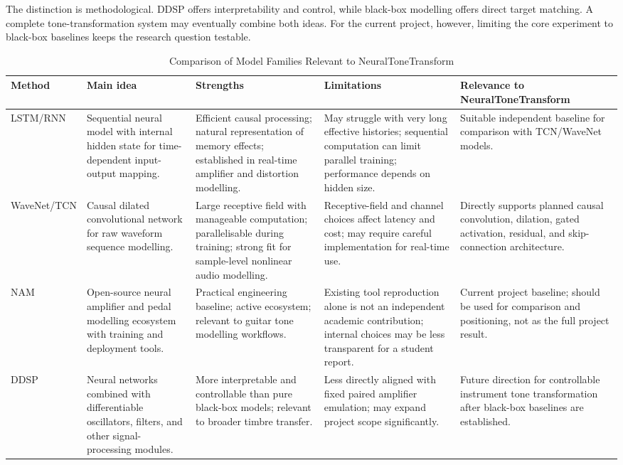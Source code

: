 \documentclass[conference]{IEEEtran}
\begin{document}
The distinction is methodological. DDSP offers interpretability and control, while black-box modelling offers direct target matching. A complete tone-transformation system may eventually combine both ideas. For the current project, however, limiting the core experiment to black-box baselines keeps the research question testable.

\begin{table}[t]
\caption{Comparison of Model Families Relevant to NeuralToneTransform}
\label{tab:model_comparison}
\centering
\footnotesize
\setlength{\tabcolsep}{3pt}
\begin{tabular}{@{}L{0.12\textwidth} L{0.19\textwidth} L{0.19\textwidth} L{0.19\textwidth} L{0.22\textwidth}@{}}
\toprule
\textbf{Method} & \textbf{Main idea} & \textbf{Strengths} & \textbf{Limitations} & \textbf{Relevance to NeuralToneTransform} \\
\midrule
LSTM/RNN & Sequential neural model with internal hidden state for time-dependent input-output mapping. & Efficient causal processing; natural representation of memory effects; established in real-time amplifier and distortion modelling. & May struggle with very long effective histories; sequential computation can limit parallel training; performance depends on hidden size. & Suitable independent baseline for comparison with TCN/WaveNet models. \\
\addlinespace
WaveNet/TCN & Causal dilated convolutional network for raw waveform sequence modelling. & Large receptive field with manageable computation; parallelisable during training; strong fit for sample-level nonlinear audio modelling. & Receptive-field and channel choices affect latency and cost; may require careful implementation for real-time use. & Directly supports planned causal convolution, dilation, gated activation, residual, and skip-connection architecture. \\
\addlinespace
NAM & Open-source neural amplifier and pedal modelling ecosystem with training and deployment tools. & Practical engineering baseline; active ecosystem; relevant to guitar tone modelling workflows. & Existing tool reproduction alone is not an independent academic contribution; internal choices may be less transparent for a student report. & Current project baseline; should be used for comparison and positioning, not as the full project result. \\
\addlinespace
DDSP & Neural networks combined with differentiable oscillators, filters, and other signal-processing modules. & More interpretable and controllable than pure black-box models; relevant to broader timbre transfer. & Less directly aligned with fixed paired amplifier emulation; may expand project scope significantly. & Future direction for controllable instrument tone transformation after black-box baselines are established. \\
\bottomrule
\end{tabular}
\end{table}
\end{document}
